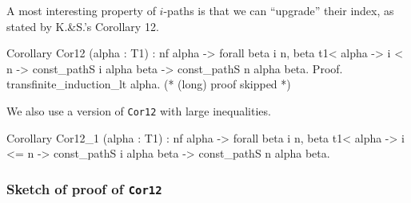 








A most interesting property of $i$-paths is that we can ``upgrade'' their index, as stated by K.\&S.'s Corollary 12.


\begin{Coqsrc}
Corollary Cor12 (alpha : T1) :  nf alpha ->
         forall beta i n, beta  t1< alpha  ->
                i < n ->
                 const_pathS i alpha beta ->
                 const_pathS n alpha beta.
Proof.
  transfinite_induction_lt alpha.
  (* (long) proof skipped *)
\end{Coqsrc}

We  also use a version of \texttt{Cor12} with large inequalities.


\begin{Coqsrc}
Corollary Cor12_1 (alpha : T1) :
  nf alpha ->
  forall beta i n, beta t1< alpha ->
                   i <= n ->
                   const_pathS i alpha beta ->
                   const_pathS n alpha beta.
\end{Coqsrc}


\subsubsection{Sketch of proof of \texttt{Cor12}}


